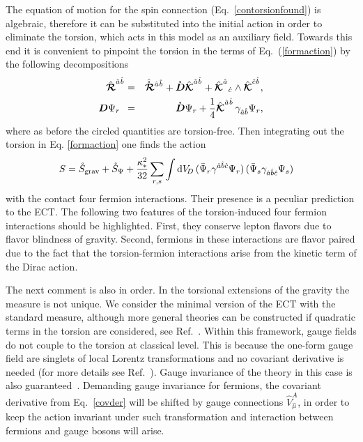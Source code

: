 \documentclass[twocolumn,showpacs,showkeys,prd,superscriptaddress]{revtex4-1}
\begin{document}
The equation of motion for the spin connection (Eq.~\eqref{contorsionfound}) is algebraic, therefore it can be substituted into the initial action in order to eliminate the torsion, which acts in this model as an auxiliary field. Towards this end it is convenient to pinpoint the torsion in the terms of Eq.~(\ref{formaction}) by the following decompositions
\begin{eqnarray}
  \label{gravdecomp}
  \Rfhn{a}{}{b}{} &=& \Rfhnfree{a}{}{b}{} + \free{\Df}\Kfhn{a}{}{b}{} + \Kfhnud{a}{}{c}{}\wedge\Kfhn{c}{}{b}{},\\
  \label{F-decomp}
  \Df\Psi_r \ \, &=& \free{\Df}\Psi_r + \frac{1}{4}\Kfhn{a}{}{b}{}\,\gamma_{\hat{a}\hat{b}}\Psi_r,
\end{eqnarray}
where as before the circled quantities are torsion-free. Then integrating out the torsion in Eq. \eqref{formaction} one finds the action
\begin{align}\label{4FI}
  S &= \free{S}_\text{grav} + \free{S}_\Psi + \frac{\kappa_* ^2}{32}\sum_{r,s}\int \dv[D]\,(\bar{\Psi}_r\gamma^{\hat{a}\hat{b}\hat{c}}\Psi_r)\,(\bar{\Psi}_s\gamma_{\hat{a}\hat{b}\hat{c}}\Psi_s)
\end{align}
with the contact four fermion interactions. Their presence is a peculiar prediction to the ECT. The following two features of the torsion-induced four fermion interactions should be highlighted. First, they conserve lepton flavors due to flavor blindness of gravity. Second, fermions in these interactions are flavor paired due to the fact that the torsion-fermion interactions arise from the kinetic term of  the Dirac action. 

The next comment is also in order. In the torsional extensions of the gravity the measure is not unique.
We consider the minimal version of the ECT with the standard measure, although more general theories can be constructed if quadratic terms in the torsion are considered, see Ref.~\cite{PhysRevD.18.2730,PhysRevD.22.1915,Baekler2011,Fabbri:2011kq}. Within this framework, gauge fields do not couple to the torsion at classical level. 
This is because the one-form gauge field are singlets of local Lorentz transformations and no covariant derivative is needed (for more details see Ref.~\cite{Benn:1980ea}). Gauge invariance of the theory in this case is also guaranteed~\cite{Hehl:1976kj}. 
Demanding gauge invariance for fermions, the covariant derivative from Eq.~\eqref{covder} will be shifted by gauge connections $\hat{V}_{\hat{\mu}}^A$, in order to keep the action invariant under such transformation and interaction between fermions and gauge bosons will arise.
\end{document}
